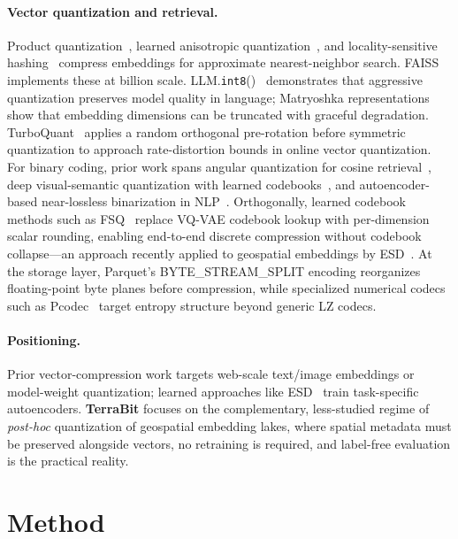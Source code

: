 \documentclass{article}
\newcommand{\method}{\textbf{TerraBit}}
\begin{document}
\paragraph{Vector quantization and retrieval.}
Product quantization~\citep{jegou2011pq}, learned anisotropic quantization~\citep{guo2020scann}, and locality-sensitive hashing~\citep{indyk1998lsh} compress embeddings for approximate nearest-neighbor search.
FAISS~\citep{johnson2021faiss} implements these at billion scale.
LLM.\texttt{int8}()~\citep{dettmers2022int8} demonstrates that aggressive quantization preserves model quality in language; Matryoshka representations~\citep{kusupati2022matryoshka} show that embedding dimensions can be truncated with graceful degradation.
TurboQuant~\citep{zandieh2025turboquant} applies a random orthogonal pre-rotation before symmetric quantization to approach rate-distortion bounds in online vector quantization.
For binary coding, prior work spans angular quantization for cosine retrieval~\citep{gong2012angular}, deep visual-semantic quantization with learned codebooks~\citep{cao2017dvsq}, and autoencoder-based near-lossless binarization in NLP~\citep{tissier2019nearlossless}.
Orthogonally, learned codebook methods such as FSQ~\citep{mentzer2023fsq} replace VQ-VAE codebook lookup with per-dimension scalar rounding, enabling end-to-end discrete compression without codebook collapse---an approach recently applied to geospatial embeddings by ESD~\citep{chen2026esd}.
At the storage layer, Parquet's BYTE\_STREAM\_SPLIT encoding reorganizes floating-point byte planes before compression, while specialized numerical codecs such as Pcodec~\citep{loncaric2025pcodec} target entropy structure beyond generic LZ codecs.

\paragraph{Positioning.}
Prior vector-compression work targets web-scale text/image embeddings or model-weight quantization; learned approaches like ESD~\citep{chen2026esd} train task-specific autoencoders.
\method{} focuses on the complementary, less-studied regime of \emph{post-hoc} quantization of geospatial embedding lakes, where spatial metadata must be preserved alongside vectors, no retraining is required, and label-free evaluation is the practical reality.

\section{Method}
\label{sec:method}
\end{document}

